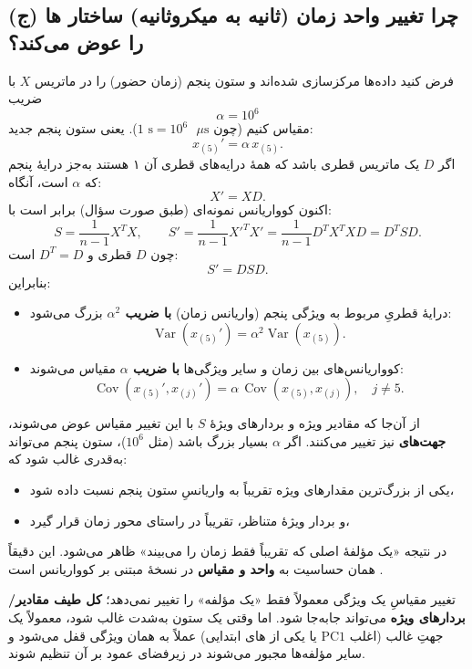 \documentclass[12pt]{report}
\begin{document}
\subsection*{(ج) چرا تغییر واحد زمان (ثانیه به میکروثانیه) ساختار ها را عوض می‌کند؟}
فرض کنید داده‌ها مرکزسازی شده‌اند و ستون پنجم (زمان حضور) را در ماتریس $X$ با ضریب
\[
\alpha = 10^{6}
\]
مقیاس کنیم (چون $1\text{ s}=10^{6}\text{ }\mu\text{s}$). یعنی ستون پنجم جدید:
\[
x_{(5)}' = \alpha\, x_{(5)}.
\]
اگر $D$ یک ماتریس قطری باشد که همهٔ درایه‌های قطری آن ۱ هستند به‌جز درایهٔ پنجم که $\alpha$ است، آنگاه:
\[
X' = X D.
\]
اکنون کوواریانس نمونه‌ای (طبق صورت سؤال) برابر است با:
\[
S = \frac{1}{n-1}X^{T}X,
\qquad
S' = \frac{1}{n-1}{X'}^{T}X' = \frac{1}{n-1}D^{T}X^{T}XD = D^{T} S D.
\]
چون $D$ قطری و $D^{T}=D$ است:
\[
S' = D S D.
\]
بنابراین:
\begin{itemize}
\item درایهٔ قطریِ مربوط به ویژگی پنجم (واریانس زمان) \textbf{با ضریب $\alpha^2$} بزرگ می‌شود:
\[
\operatorname{Var}(x_{(5)}') = \alpha^{2}\operatorname{Var}(x_{(5)}).
\]
\item کوواریانس‌های بین زمان و سایر ویژگی‌ها \textbf{با ضریب $\alpha$} مقیاس می‌شوند:
\[
\operatorname{Cov}(x_{(5)}',x_{(j)}')=\alpha\,\operatorname{Cov}(x_{(5)},x_{(j)}),\quad j\neq 5.
\]
\end{itemize}

از آن‌جا که مقادیر ویژه و بردارهای ویژهٔ $S$ با این تغییر مقیاس عوض می‌شوند، \textbf{جهت‌های } نیز تغییر می‌کنند. اگر $\alpha$ بسیار بزرگ باشد (مثل $10^{6}$)، ستون پنجم می‌تواند به‌قدری غالب شود که:
\begin{itemize}
\item یکی از بزرگ‌ترین مقدارهای ویژه تقریباً به واریانسِ ستون پنجم نسبت داده شود،
\item و بردار ویژهٔ متناظر، تقریباً در راستای محور زمان قرار گیرد،
\end{itemize}
در نتیجه «یک مؤلفهٔ اصلی که تقریباً فقط زمان را می‌بیند» ظاهر می‌شود. این دقیقاً همان حساسیت  به \textbf{واحد و مقیاس} در نسخهٔ مبتنی بر کوواریانس است .


تغییر مقیاسِ یک ویژگی معمولاً فقط «یک مؤلفه» را تغییر نمی‌دهد؛ \textbf{کل طیف مقادیر/بردارهای ویژه} می‌تواند جابه‌جا شود. اما وقتی یک ستون به‌شدت غالب شود، معمولاً یک جهتِ غالب (اغلب $\text{PC1}$ یا یکی از های ابتدایی) عملاً به همان ویژگی قفل می‌شود و سایر مؤلفه‌ها مجبور می‌شوند در زیرفضای عمود بر آن تنظیم شوند.
\end{document}
